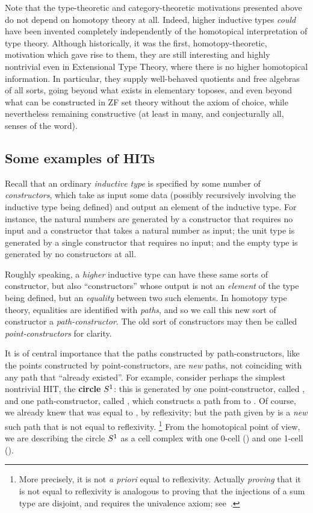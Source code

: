 \documentclass{amsart}
\begin{document}
Note that the type-theoretic and category-theoretic motivations presented above do not depend on homotopy theory at all.
Indeed, higher inductive types \emph{could} have been invented completely independently of the homotopical interpretation of type theory.
Although historically, it was the first, homotopy-theoretic, motivation which gave rise to them, they are still interesting and highly nontrivial even in Extensional Type Theory, where there is no higher homotopical information.
In particular, they supply well-behaved quotients and free algebras of all sorts, going beyond what exists in elementary toposes, and even beyond what can be constructed in ZF set theory without the axiom of choice, while nevertheless remaining constructive (at least in many, and conjecturally all, senses of the word).


\subsection{Some examples of HITs}
\label{sec:hit-egs}

Recall that an ordinary \emph{inductive type} is specified by some number of \emph{constructors}, which take as input some data (possibly recursively involving the inductive type being defined) and output an element of the inductive type.
For instance, the natural numbers are generated by a constructor \fzero that requires no input and a constructor \fsucc that takes a natural number as input; the unit type is generated by a single constructor \ftt that requires no input; and the empty type is generated by no constructors at all.

Roughly speaking, a \emph{higher} inductive type can have these same sorts of constructor, but also ``constructors'' whose output is not an \emph{element} of the type being defined, but an \emph{equality} between two such elements.
In homotopy type theory, equalities are identified with \emph{paths}, and so we call this new sort of constructor a \emph{path-constructor}.
The old sort of constructors may then be called \emph{point-constructors} for clarity.

It is of central importance that the paths constructed by path-constructors, like the points constructed by point-constructors, are \emph{new} paths, not coinciding with any path that ``already existed''.
For example, consider perhaps the simplest nontrivial HIT, the \textbf{circle} $S^1$: this is generated by one point-constructor, called \fbase, and one path-constructor, called \floop, which constructs a path from \fbase to \fbase.
Of course, we already knew that \fbase was equal to \fbase, by reflexivity; but the path given by \floop is a \emph{new} such path that is not equal to reflexivity.%
\footnote{More precisely, it is not \textit{a priori} equal to reflexivity.
  Actually \emph{proving} that it is not equal to reflexivity is analogous to proving that the injections of a sum type are disjoint, and requires the univalence axiom; see~\cite{hottbook,ls:pi1s1}.}
From the homotopical point of view, we are describing the circle $S^1$ as a cell complex with one 0-cell (\fbase) and one 1-cell (\floop).
\end{document}
